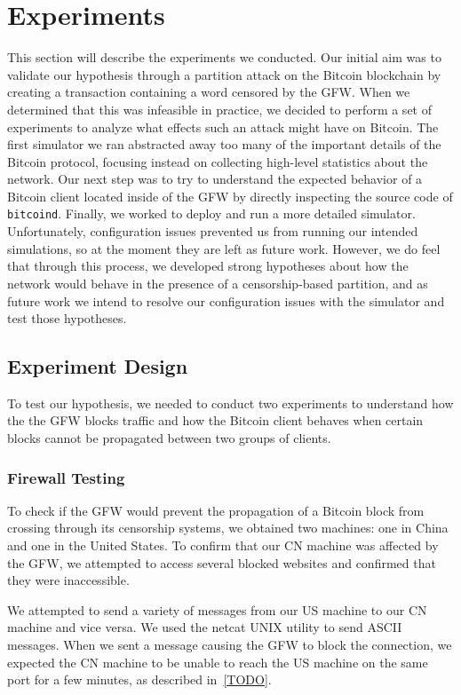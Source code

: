 \section{Experiments}
This section will describe the experiments we conducted. Our initial aim was to validate our hypothesis through a partition attack on the Bitcoin blockchain by creating a transaction containing a word censored by the GFW. When we determined that this was infeasible in practice, we decided to perform a set of experiments to analyze what effects such an attack might have on Bitcoin. The first simulator we ran abstracted away too many of the important details of the Bitcoin protocol, focusing instead on collecting high-level statistics about the network. Our next step was to try to understand the expected behavior of a Bitcoin client located inside of the GFW by directly inspecting the source code of \texttt{bitcoind}. Finally, we worked to deploy and run a more detailed simulator. Unfortunately, configuration issues prevented us from running our intended simulations, so at the moment they are left as future work. However, we do feel that through this process, we developed strong hypotheses about how the network would behave in the presence of a censorship-based partition, and as future work we intend to resolve our configuration issues with the simulator and test those hypotheses.

\subsection{Experiment Design}

To test our hypothesis, we needed to conduct two experiments to understand how the the GFW blocks traffic and how the Bitcoin client behaves when certain blocks cannot be propagated between two groups of clients.

\subsubsection{Firewall Testing}
To check if the GFW would prevent the propagation of a Bitcoin block from crossing through its censorship systems, we obtained two machines: one in China and one in the United States. To confirm that our CN machine was affected by the GFW, we attempted to access several blocked websites and confirmed that they were inaccessible.

We attempted to send a variety of messages from our US machine to our CN machine and vice versa. We used the netcat UNIX utility to send ASCII messages. When we sent a message causing the GFW to block the connection, we expected the CN machine to be unable to reach the US machine on the same port for a few minutes, as described in~\ref{TODO}.

